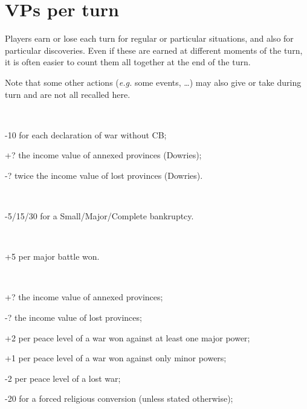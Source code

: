 \section{VPs per turn}\label{chVictories:Turn VP}
\aparag Players earn or lose \VPs each turn for regular or particular
situations, and also for particular discoveries.
\bparag Even if these \VPs are earned at different moments of the turn, it is
often easier to count them all together at the end of the turn.

\aparag Note that some other actions (\emph{e.g.} some events, \ldots) may
also give or take \VPs during turn and are not all recalled here.

~\\
\begin{modlist}
\item[-10] for each declaration of war without CB;
\item[+?] the income value of annexed provinces (Dowries);
\item[-?] twice the income value of lost provinces (Dowries).
\end{modlist}

~\\
\begin{modlist}
\item[-5/15/30] for a Small/Major/Complete bankruptcy.
\end{modlist}

~\\
\begin{modlist}
\item[+5] per major battle won.
\end{modlist}

~\\
\begin{modlist}
\item[+?] the income value of annexed provinces;
\item[-?] the income value of lost provinces;
\item[+2] per peace level of a war won against at least one major power;
\item[+1] per peace level of a war won against only minor powers;
\item[-2] per peace level of a lost war;
\item[-20] for a forced religious conversion (unless stated otherwise);
\end{modlist}

